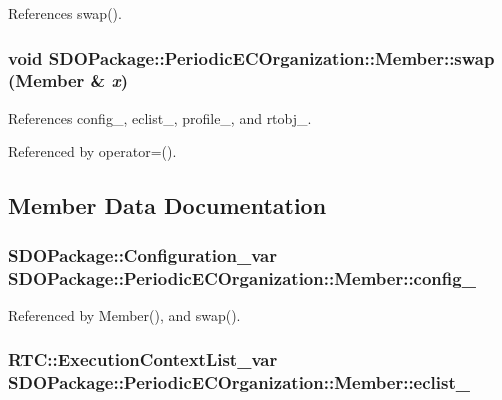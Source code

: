 References swap().

\subsubsection[{swap}]{\setlength{\rightskip}{0pt plus 5cm}void SDOPackage::PeriodicECOrganization::Member::swap ({\bf Member} \& {\em x})\hspace{0.3cm}{\ttfamily  [inline]}}\label{classSDOPackage_1_1PeriodicECOrganization_1_1Member_ad526a20e09d93347bb4578e3192ca478}


References config\_\-, eclist\_\-, profile\_\-, and rtobj\_\-.



Referenced by operator=().



\subsection{Member Data Documentation}
\subsubsection[{config\_\-}]{\setlength{\rightskip}{0pt plus 5cm}SDOPackage::Configuration\_\-var {\bf SDOPackage::PeriodicECOrganization::Member::config\_\-}}\label{classSDOPackage_1_1PeriodicECOrganization_1_1Member_a2a466abb4e15a0264fde695bee842659}


Referenced by Member(), and swap().

\subsubsection[{eclist\_\-}]{\setlength{\rightskip}{0pt plus 5cm}RTC::ExecutionContextList\_\-var {\bf SDOPackage::PeriodicECOrganization::Member::eclist\_\-}}\label{classSDOPackage_1_1PeriodicECOrganization_1_1Member_a4e5384287a87a77a53fb2dd22e49c693}


